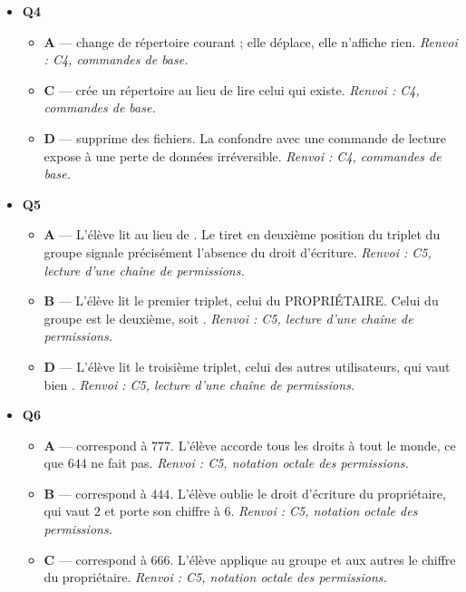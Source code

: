\begin{itemize}
\begin{itemize}
  \end{itemize}
  \item \textbf{Q4}
  \begin{itemize}
    \item \textbf{A} —  change de répertoire courant ; elle déplace, elle n'affiche rien. \emph{Renvoi : C4, commandes de base.}
    \item \textbf{C} —  crée un répertoire au lieu de lire celui qui existe. \emph{Renvoi : C4, commandes de base.}
    \item \textbf{D} —  supprime des fichiers. La confondre avec une commande de lecture expose à une perte de données irréversible. \emph{Renvoi : C4, commandes de base.}
  \end{itemize}
  \item \textbf{Q5}
  \begin{itemize}
    \item \textbf{A} — L'élève lit  au lieu de . Le tiret en deuxième position du triplet du groupe signale précisément l'absence du droit d'écriture. \emph{Renvoi : C5, lecture d'une chaîne de permissions.}
    \item \textbf{B} — L'élève lit le premier triplet, celui du PROPRIÉTAIRE. Celui du groupe est le deuxième, soit . \emph{Renvoi : C5, lecture d'une chaîne de permissions.}
    \item \textbf{D} — L'élève lit le troisième triplet, celui des autres utilisateurs, qui vaut bien \code{---}. \emph{Renvoi : C5, lecture d'une chaîne de permissions.}
  \end{itemize}
  \item \textbf{Q6}
  \begin{itemize}
    \item \textbf{A} —  correspond à $777$. L'élève accorde tous les droits à tout le monde, ce que $644$ ne fait pas. \emph{Renvoi : C5, notation octale des permissions.}
    \item \textbf{B} —  correspond à $444$. L'élève oublie le droit d'écriture du propriétaire, qui vaut $2$ et porte son chiffre à $6$. \emph{Renvoi : C5, notation octale des permissions.}
    \item \textbf{C} —  correspond à $666$. L'élève applique au groupe et aux autres le chiffre du propriétaire. \emph{Renvoi : C5, notation octale des permissions.}
  \end{itemize}
\end{itemize}
\fi
